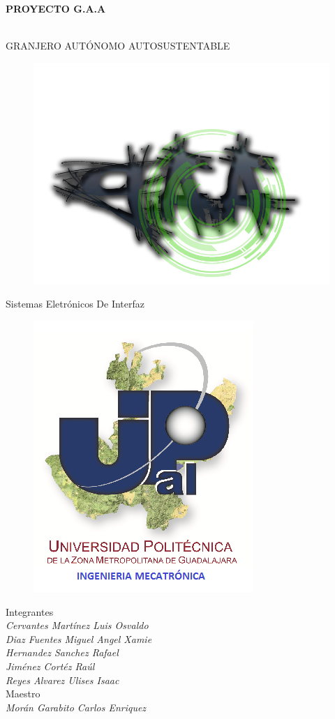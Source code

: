 \documentclass[11pt,a4paper]{article}
\author{Miguel Angel Xamie Diaz Fuentes}
\begin{document}
\begin{center}
\begin{LARGE}
\textbf{PROYECTO G.A.A}
\end{LARGE}
\\
GRANJERO AUTÓNOMO AUTOSUSTENTABLE\\

\begin{figure}[hbtp]
\centering
\includegraphics[scale=0.30]{LOGO.png}
\end{figure}
Sistemas Eletrónicos De Interfaz\\
\begin{figure}[hbtp]
\centering
\includegraphics[scale=0.50]{UPZMG_Mecatr_nica.png}
\end{figure} 


Integrantes
\\\textit{
Cervantes Martínez Luis Osvaldo\\ 
Diaz Fuentes Miguel Angel Xamie \\
Hernandez Sanchez Rafael\\
Jiménez Cortéz Raúl\\
Reyes Alvarez Ulises Isaac
}
\\Maestro
\\\textit{Morán Garabito Carlos Enriquez}
\end{center}
\end{document}
